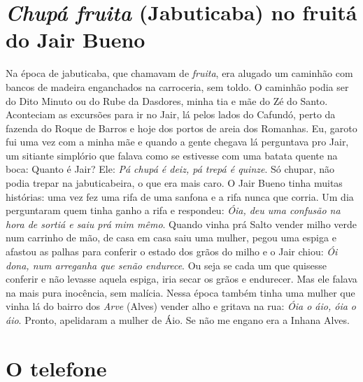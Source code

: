 \documentclass[12pt,brazil,]{book}
\begin{document}
\section{\texorpdfstring{\emph{Chupá fruita} (Jabuticaba) no fruitá do
Jair
Bueno}{Chupá fruita (Jabuticaba) no fruitá do Jair Bueno}}\label{chupuxe1-fruita-jabuticaba-no-fruituxe1-do-jair-bueno}

Na época de jabuticaba, que chamavam de \emph{fruita}, era alugado um
caminhão com bancos de madeira enganchados na carroceria, sem toldo. O
caminhão podia ser do Dito Minuto ou do Rube da Dasdores, minha tia e
mãe do Zé do Santo. Aconteciam as excursões para ir no Jair, lá pelos
lados do Cafundó, perto da fazenda do Roque de Barros e hoje dos portos
de areia dos Romanhas. Eu, garoto fui uma vez com a minha mãe e quando a
gente chegava lá perguntava pro Jair, um sitiante simplório que falava
como se estivesse com uma batata quente na boca: Quanto é Jair? Ele:
\emph{Pá chupá é deiz, pá trepá é quinze}. Só chupar, não podia trepar
na jabuticabeira, o que era mais caro. O Jair Bueno tinha muitas
histórias: uma vez fez uma rifa de uma sanfona e a rifa nunca que
corria. Um dia perguntaram quem tinha ganho a rifa e respondeu:
\emph{Óia, deu uma confusão na hora de sortiá e saiu prá mim mêmo}.
Quando vinha prá Salto vender milho verde num carrinho de mão, de casa
em casa saiu uma mulher, pegou uma espiga e afastou as palhas para
conferir o estado dos grãos do milho e o Jair chiou: \emph{Ói dona, num
arreganha que senão endurece}. Ou seja se cada um que quisesse conferir
e não levasse aquela espiga, iria secar os grãos e endurecer. Mas ele
falava na mais pura inocência, sem malícia. Nessa época também tinha uma
mulher que vinha lá do bairro dos \emph{Arve} (Alves) vender alho e
gritava na rua: \emph{Óia o áio, óia o áio}. Pronto, apelidaram a mulher
de Áio. Se não me engano era a Inhana Alves.

\section{O telefone}\label{o-telefone}
\end{document}
